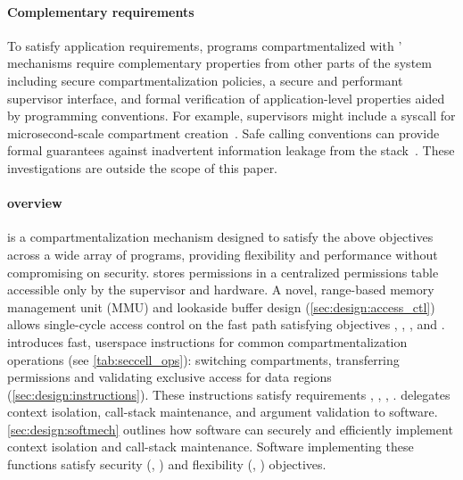 \paragraph{Complementary requirements}
To satisfy application requirements,
programs compartmentalized with \seccells' mechanisms require
complementary properties from other parts of the system
including secure compartmentalization policies, 
a secure and performant supervisor interface, 
and formal verification of application-level properties
aided by programming conventions.
For example, supervisors might include a syscall for 
microsecond-scale compartment creation~\cite{LittonVE0BD16}.
Safe calling conventions can provide formal guarantees against
inadvertent information leakage from the stack~\cite{SkorstengaardDB20}.
These investigations are outside the scope of this paper.

\paragraph{\seccells overview}
\seccells is a compartmentalization mechanism designed
to satisfy the above objectives across a wide array of 
programs, providing flexibility and performance without compromising on 
security.
\seccells stores permissions in a centralized permissions table accessible 
only by the supervisor and hardware.
A novel, range-based memory management unit (MMU) and 
lookaside buffer design (\autoref{sec:design:access_ctl})
allows single-cycle access control on the fast path satisfying 
objectives , , , and .
\seccells introduces fast, userspace instructions for common 
compartmentalization operations (see \autoref{tab:seccell_ops}): 
switching compartments, transferring permissions and validating
exclusive access for data regions (\autoref{sec:design:instructions}).
These instructions satisfy requirements , ,
, .
\seccells delegates context isolation, call-stack maintenance,
and argument validation to software.
\autoref{sec:design:softmech} outlines how software can
securely and efficiently implement context isolation and call-stack 
maintenance.
Software implementing these functions satisfy security (, )
and flexibility (, ) objectives.

\section{\seccells}
\label{sec:design}

